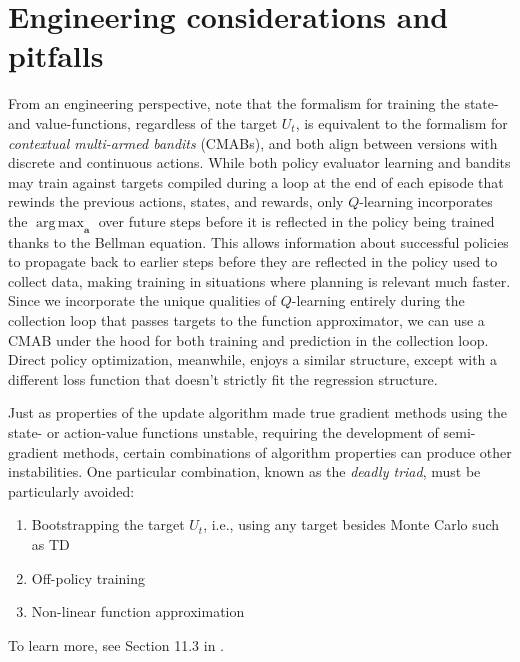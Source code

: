 \documentclass{article}
\DeclareMathOperator*{\argmax}{arg\,max}
\begin{document}
\section{Engineering considerations and pitfalls}

From an engineering perspective, note that the formalism for training the state- and value-functions, regardless of the target $U_t$, is equivalent to the formalism for \textit{contextual multi-armed bandits} (CMABs), and both align between versions with discrete and continuous actions. While both policy evaluator learning and bandits may train against targets compiled during a loop at the end of each episode that rewinds the previous actions, states, and rewards, only $Q$-learning incorporates the $\argmax_\mathbf{a}$ over future steps before it is reflected in the policy being trained thanks to the Bellman equation. This allows information about successful policies to propagate back to earlier steps before they are reflected in the policy used to collect data, making training in situations where planning is relevant much faster. Since we incorporate the unique qualities of $Q$-learning entirely during the collection loop that passes targets to the function approximator, we can use a CMAB under the hood for both training and prediction in the collection loop.  Direct policy optimization, meanwhile, enjoys a similar structure, except with a different loss function that doesn't strictly fit the regression structure.

Just as properties of the update algorithm made true gradient methods using the state- or action-value functions unstable, requiring the development of semi-gradient methods, certain combinations of algorithm properties can produce other instabilities. One particular combination, known as the \textit{deadly triad}, must be particularly avoided:
\begin{enumerate}
\item Bootstrapping the target $U_t$, i.e., using any target besides Monte Carlo such as TD
\item Off-policy training
\item Non-linear function approximation
\end{enumerate}
To learn more, see Section 11.3 in \cite{sutton_barto_rl}.
\end{document}
